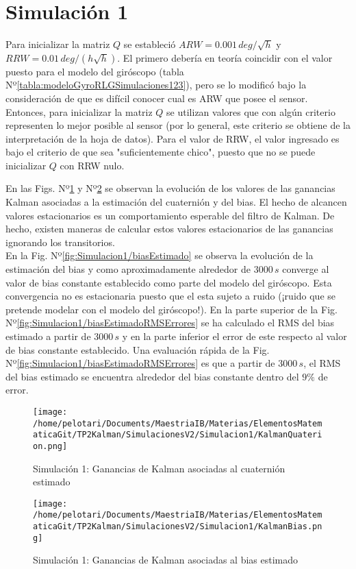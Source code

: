 \documentclass[a4paper,11pt,twoside]{IT-CNEA}
\begin{document}
\section{Simulación 1}
Para inicializar la matriz $Q$ se estableció $ARW=0.001\,deg/\sqrt{h}$ y $RRW=0.01\,deg/\left( h\sqrt{h}\right)$. El primero debería en teoría coincidir con el valor puesto para el modelo del giróscopo (tabla Nº\ref{tabla:modeloGyroRLGSimulaciones123}), pero se lo modificó bajo la consideración de que es difícil conocer cual es ARW que posee el sensor. Entonces, para inicializar la matriz $Q$ se utilizan valores que con algún criterio representen lo mejor posible al sensor (por lo general, este criterio se obtiene de la interpretación de la hoja de datos). Para el valor de RRW, el valor ingresado es bajo el criterio de que sea "suficientemente chico", puesto que no se puede inicializar $Q$ con RRW nulo. 
\par En las Figs. Nº\ref{fig:Simulacion1/KalmanQuaterion} y Nº\ref{fig:Simulacion1/KalmanBias} se observan la evolución de los valores de las ganancias Kalman asociadas a la estimación del cuaternión y del bias. El hecho de alcancen valores estacionarios es un comportamiento esperable del filtro de Kalman. De hecho, existen maneras de calcular estos valores estacionarios de las ganancias ignorando los transitorios. 
\\ En la Fig. Nº\ref{fig:Simulacion1/biasEstimado} se observa la evolución de la estimación del bias y como aproximadamente alrededor de $3000\,s$ converge al valor de bias constante establecido como parte del modelo del giróscopo. Esta convergencia no es estacionaria puesto que el esta sujeto a ruido (¡ruido que se pretende modelar con el modelo del giróscopo!). En la parte superior de la Fig. Nº\ref{fig:Simulacion1/biasEstimadoRMSErrores} se ha calculado el RMS del bias estimado a partir de $3000\,s$ y en la parte inferior el error de este respecto al valor de bias constante establecido. Una evaluación rápida de la Fig. Nº\ref{fig:Simulacion1/biasEstimadoRMSErrores} es que a partir de $3000\,s$, el RMS del bias estimado se encuentra alrededor del bias constante dentro del $9\%$ de error. 
\begin{figure}[h!]
\centering
\texttt{[image: /home/pelotari/Documents/MaestriaIB/Materias/ElementosMatematicaGit/TP2Kalman/SimulacionesV2/Simulacion1/KalmanQuaterion.png]}
\caption{Simulación 1: Ganancias de Kalman asociadas al cuaternión estimado}
\label{fig:Simulacion1/KalmanQuaterion}
\end{figure}
\begin{figure}[h!]
\centering
\texttt{[image: /home/pelotari/Documents/MaestriaIB/Materias/ElementosMatematicaGit/TP2Kalman/SimulacionesV2/Simulacion1/KalmanBias.png]}
\caption{Simulación 1: Ganancias de Kalman asociadas al bias estimado}
\label{fig:Simulacion1/KalmanBias}
\end{figure}
\end{document}
